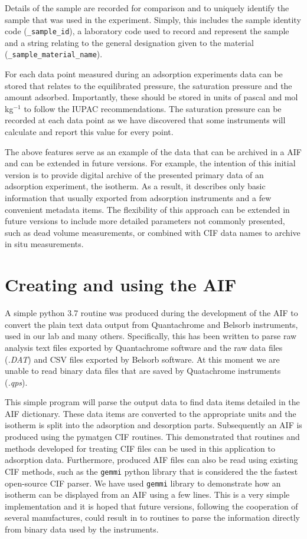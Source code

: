 \documentclass[journal=langd5,manuscript=article]{achemso}
\begin{document}
Details of the sample are recorded for comparison and to uniquely identify the sample that was used in the experiment.
Simply, this includes the sample identity code (\texttt{\_sample\_id}), a laboratory code used to record and represent the sample and a string relating to the general designation given to the material (\texttt{\_sample\_material\_name}).

For each data point measured during an adsorption experiments data can be stored that relates to the equilibrated pressure, the saturation pressure and the amount adsorbed. Importantly, these should be stored in units of pascal and mol$\,$kg$^{-1}$ to follow the IUPAC recommendations.\cite{10.1515/pac-2014-1117}
The saturation pressure can be recorded at each data point as we have discovered that some instruments will calculate and report this value for every point.

The above features serve as an example of the data that can be archived in a AIF and can be extended in future versions.
For example, the intention of this initial version is to provide digital archive of the presented primary data of an adsorption experiment, the isotherm.
As a result, it describes only basic information that usually exported from adsorption instruments and a few convenient metadata items.
The flexibility of this approach can be extended in future versions to include more detailed parameters not commonly presented, such as dead volume measurements, or combined with CIF data names to archive in situ measurements.

\section{Creating and using the AIF}
A simple python 3.7 routine was produced during the development of the AIF to convert the plain text data output from Quantachrome and Belsorb instruments, used in our lab and many others.
Specifically, this has been written to parse raw analysis text files exported by Quantachrome software and the raw data files (\textit{.DAT}) and CSV files exported by Belsorb software.
At this moment we are unable to read binary data files that are saved by Quatachrome instruments (\textit{.qps}).

This simple program will parse the output data to find data items detailed in the AIF dictionary.
These data items are converted to the appropriate units and the isotherm is split into the adsorption and desorption parts.
Subsequently an AIF is produced using the pymatgen CIF routines.\cite{10.1016/j.commatsci.2012.10.028}
This demonstrated that routines and methods developed for treating CIF files can be used in this application to adsorption data.
Furthermore, produced AIF files can also be read using existing CIF methods, such as the \texttt{gemmi} python library that is considered the the fastest open-source CIF parser.\cite{gemmi}
We have used \texttt{gemmi} library to demonstrate how an isotherm can be displayed from an AIF using a few lines.
This is a very simple implementation and it is hoped that future versions, following the cooperation of several manufactures, could result in to routines to parse the information directly from binary data used by the instruments.
\end{document}
